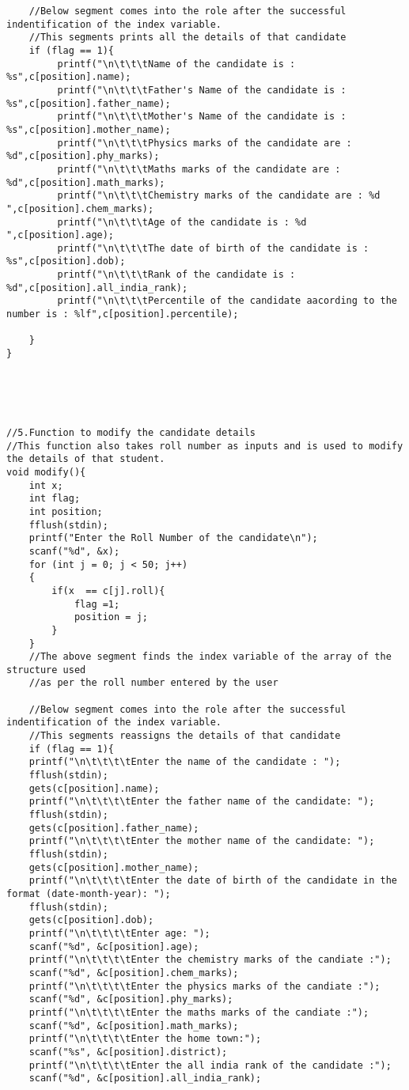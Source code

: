 \documentclass{article}
\begin{document}
\begin{FlushLeft}
\begin{verbatim}
    //Below segment comes into the role after the successful indentification of the index variable.
    //This segments prints all the details of that candidate
    if (flag == 1){
         printf("\n\t\t\tName of the candidate is : %s",c[position].name);
         printf("\n\t\t\tFather's Name of the candidate is : %s",c[position].father_name);
         printf("\n\t\t\tMother's Name of the candidate is : %s",c[position].mother_name);
         printf("\n\t\t\tPhysics marks of the candidate are : %d",c[position].phy_marks);
         printf("\n\t\t\tMaths marks of the candidate are : %d",c[position].math_marks);
         printf("\n\t\t\tChemistry marks of the candidate are : %d ",c[position].chem_marks);
         printf("\n\t\t\tAge of the candidate is : %d ",c[position].age);
         printf("\n\t\t\tThe date of birth of the candidate is : %s",c[position].dob);
         printf("\n\t\t\tRank of the candidate is : %d",c[position].all_india_rank);
         printf("\n\t\t\tPercentile of the candidate aacording to the number is : %lf",c[position].percentile);
         
    }   
}





//5.Function to modify the candidate details
//This function also takes roll number as inputs and is used to modify the details of that student. 
void modify(){
    int x;
    int flag;
    int position;
    fflush(stdin);
    printf("Enter the Roll Number of the candidate\n");
    scanf("%d", &x);
    for (int j = 0; j < 50; j++)
    {
        if(x  == c[j].roll){
            flag =1;
            position = j;
        }
    }
    //The above segment finds the index variable of the array of the structure used 
    //as per the roll number entered by the user 
    
    //Below segment comes into the role after the successful indentification of the index variable.
    //This segments reassigns the details of that candidate
    if (flag == 1){
    printf("\n\t\t\t\tEnter the name of the candidate : ");
    fflush(stdin);
    gets(c[position].name);
    printf("\n\t\t\t\tEnter the father name of the candidate: ");
    fflush(stdin);
    gets(c[position].father_name);
    printf("\n\t\t\t\tEnter the mother name of the candidate: ");
    fflush(stdin);
    gets(c[position].mother_name);
    printf("\n\t\t\t\tEnter the date of birth of the candidate in the format (date-month-year): ");
    fflush(stdin);
    gets(c[position].dob);
    printf("\n\t\t\t\tEnter age: ");
    scanf("%d", &c[position].age);
    printf("\n\t\t\t\tEnter the chemistry marks of the candiate :");
    scanf("%d", &c[position].chem_marks);
    printf("\n\t\t\t\tEnter the physics marks of the candiate :");
    scanf("%d", &c[position].phy_marks);
    printf("\n\t\t\t\tEnter the maths marks of the candiate :");
    scanf("%d", &c[position].math_marks);
    printf("\n\t\t\t\tEnter the home town:");
    scanf("%s", &c[position].district);
    printf("\n\t\t\t\tEnter the all india rank of the candidate :");
    scanf("%d", &c[position].all_india_rank);
         

\end{verbatim}
\end{FlushLeft}
\end{document}
